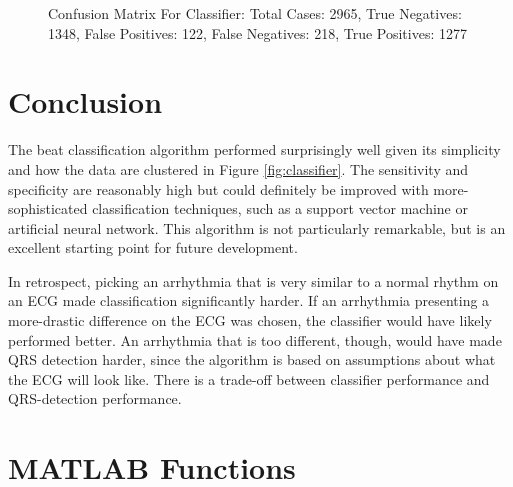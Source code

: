 \documentclass[titlepage,12pt,letter]{article}
\begin{document}
\begin{figure}[htbp]
    \centering
    \label{fig:confusion}
    \caption{Confusion Matrix For Classifier: Total Cases: 2965, True Negatives:
    1348, False Positives: 122, False Negatives: 218, True Positives: 1277}
\end{figure}

\section{Conclusion}
The beat classification algorithm performed surprisingly well given its
simplicity and how the data are clustered in Figure \ref{fig:classifier}.  The
sensitivity and specificity are reasonably high but could definitely be improved
with more-sophisticated classification techniques, such as a support vector
machine or artificial neural network.  This algorithm is not particularly
remarkable, but is an excellent starting point for future development.  

In retrospect, picking an arrhythmia that is very similar to a normal rhythm on
an ECG made classification significantly harder.  If an arrhythmia presenting a
more-drastic difference on the ECG was chosen, the classifier would have likely
performed better.  An arrhythmia that is too different, though, would have made
QRS detection harder, since the algorithm is based on assumptions about what the
ECG will look like.  There is a trade-off between classifier performance and
QRS-detection performance.  

\newpage
\appendix
\section{MATLAB Functions}
\end{document}
